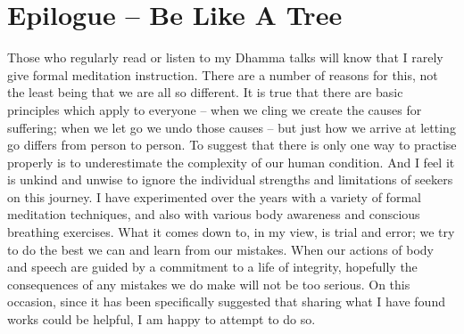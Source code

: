 

\chapter{Epilogue -- Be Like A Tree}


Those who regularly read or listen to my Dhamma talks will know that I
rarely give formal meditation instruction. There are a number of reasons
for this, not the least being that we are all so different. It is true
that there are basic principles which apply to everyone – when we cling
we create the causes for suffering; when we let go we undo those causes
– but just how we arrive at letting go differs from person to person. To
suggest that there is only one way to practise properly is to
underestimate the complexity of our human condition. And I feel it is
unkind and unwise to ignore the individual strengths and limitations of
seekers on this journey. I have experimented over the years with a
variety of formal meditation techniques, and also with various body
awareness and conscious breathing exercises. What it comes down to, in
my view, is trial and error; we try to do the best we can and learn from
our mistakes. When our actions of body and speech are guided by a
commitment to a life of integrity, hopefully the consequences of any
mistakes we do make will not be too serious. On this occasion, since it
has been specifically suggested that sharing what I have found works
could be helpful, I am happy to attempt to do so.

